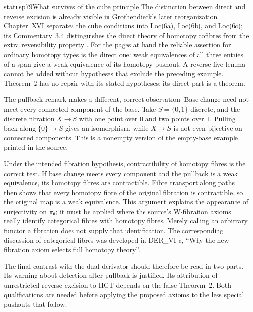 \begin{dcomment}{status}{p79}{What survives of the cube principle}
The distinction between direct and reverse excision is already visible in Grothendieck's later reorganization. Chapter~XVI separates the cube conditions into Loc(6a), Loc(6b), and Loc(6c); its Commentary~3.4 distinguishes the direct theory of homotopy cofibres from the extra reversibility property \citep[\S3, manuscript pp.~16--27]{GrothendieckDerivateursXVI}. For the pages at hand the reliable assertion for ordinary homotopy types is the direct one: weak equivalences of all three entries of a span give a weak equivalence of its homotopy pushout. A reverse five lemma cannot be added without hypotheses that exclude the preceding example. Theorem~2 has no repair with its stated hypotheses; its direct part is a theorem.

The pullback remark makes a different, correct observation. Base change need not meet every connected component of the base. Take $S=\{0,1\}$ discrete, and the discrete fibration $X\to S$ with one point over $0$ and two points over $1$. Pulling back along $\{0\}\to S$ gives an isomorphism, while $X\to S$ is not even bijective on connected components. This is a nonempty version of the empty-base example printed in the source.

Under the intended fibration hypothesis, contractibility of homotopy fibres is the correct test. If base change meets every component and the pullback is a weak equivalence, its homotopy fibres are contractible. Fibre transport along paths then shows that every homotopy fibre of the original fibration is contractible, so the original map is a weak equivalence. This argument explains the appearance of surjectivity on $\pi_0$; it must be applied where the source's W-fibration axioms really identify categorical fibres with homotopy fibres. Merely calling an arbitrary functor a fibration does not supply that identification. The corresponding discussion of categorical fibres was developed in DER\_VI-a, ``Why the new fibration axiom selects full homotopy theory''.

The final contrast with the dual derivator should therefore be read in two parts. Its warning about detection after pullback is justified. Its attribution of unrestricted reverse excision to $\mathrm{HOT}$ depends on the false Theorem~2. Both qualifications are needed before applying the proposed axioms to the less special pushouts that follow.
\end{dcomment}

